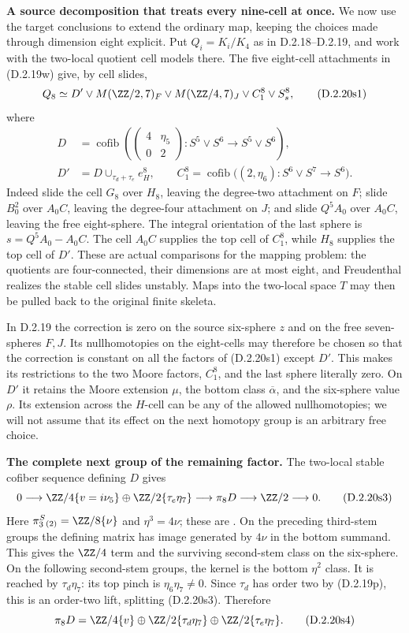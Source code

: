 \medskip\noindent
\textbf{A source decomposition that treats every nine-cell at once.}
We now use the target conclusions to extend the ordinary map,
keeping the choices made through dimension eight explicit.
Put $Q_i=K_i/K_4$ as in D.2.18--D.2.19, and work with the
two-local quotient cell models there. The five eight-cell
attachments in \textup{(D.2.19w)} give, by cell slides,
\[
 Q_8\simeq D'\vee M(\ZZ/2,7)_F\vee M(\ZZ/4,7)_J
                  \vee C_1^8\vee S^8_s,
 \tag{D.2.20s1}
\]
where
\[
\begin{split}
 D&=\operatorname{cofib}\left(
  \begin{pmatrix}4&\eta_5\\0&2\end{pmatrix}:
  S^5\vee S^6\longrightarrow S^5\vee S^6\right),\\
 D'&=D\cup_{\tau_d+\tau_e}e^8_H,\qquad
 C_1^8=\operatorname{cofib}\bigl((2,\eta_6):S^6\vee S^7\to S^6\bigr).
\end{split}
 \tag{D.2.20s2}
\]
Indeed slide the cell $G_8$ over $H_8$, leaving the
degree-two attachment on $F$; slide $B_0^2$ over $A_0C$,
leaving the degree-four attachment on $J$; and slide
$Q^5A_0$ over $A_0C$, leaving the free eight-sphere.
The integral orientation of the last sphere is
$s=Q^5A_0-A_0C$. The cell $A_0C$ supplies the top
cell of $C_1^8$, while $H_8$ supplies the top cell of $D'$.
These are actual comparisons for the mapping problem:
the quotients are four-connected, their dimensions are
at most eight, and Freudenthal realizes the stable cell
slides unstably. Maps into the two-local space $T$ may
then be pulled back to the original finite skeleta.

In D.2.19 the correction is zero on the source six-sphere
$z$ and on the free seven-spheres $F,J$. Its nullhomotopies
on the eight-cells may therefore be chosen so that the
correction is constant on all the factors of
\textup{(D.2.20s1)} except $D'$. This makes its restrictions
to the two Moore factors, $C_1^8$, and the last sphere
literally zero. On $D'$ it retains the Moore extension
$\mu$, the bottom class $\overline\alpha$, and the
six-sphere value $\rho$. Its extension across the
$H$-cell can be any of the allowed nullhomotopies;
we will not assume that its effect on the next
homotopy group is an arbitrary free choice.

\medskip\noindent
\textbf{The complete next group of the remaining factor.}
The two-local stable cofiber sequence defining $D$ gives
\[
 0\longrightarrow
   \ZZ/4\{v=i\nu_5\}\oplus\ZZ/2\{\tau_e\eta_7\}
 \longrightarrow\pi_8D\longrightarrow\ZZ/2\longrightarrow0.
 \tag{D.2.20s3}
\]
Here $\pi_3^S{}_{(2)}=\ZZ/8\{\nu\}$ and
$\eta^3=4\nu$; these are
\cite[\S2, (2.1)(c)--(d), p.~149]{I_Oka1986}.
On the preceding third-stem groups the defining matrix
has image generated by $4\nu$ in the bottom summand.
This gives the $\ZZ/4$ term and the surviving
second-stem class on the six-sphere. On the following
second-stem groups, the kernel is the bottom $\eta^2$
class. It is reached by $\tau_d\eta_7$: its top
pinch is $\eta_6\eta_7\ne0$. Since $\tau_d$ has
order two by \textup{(D.2.19p)}, this is an order-two
lift, splitting \textup{(D.2.20s3)}. Therefore
\[
 \pi_8D=
 \ZZ/4\{v\}\oplus
 \ZZ/2\{\tau_d\eta_7\}\oplus
 \ZZ/2\{\tau_e\eta_7\}.
 \tag{D.2.20s4}
\]

